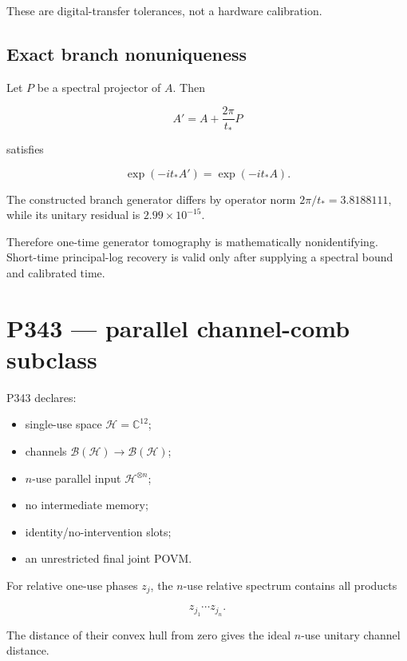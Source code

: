 \documentclass[11pt,a4paper,openany]{report}
\begin{document}
These are digital-transfer tolerances, not a hardware calibration.

\section{Exact branch nonuniqueness}

Let \(P\) be a spectral projector of \(A\). Then

\[
A'=A+\frac{2\pi}{t_*}P
\]

satisfies

\[
\exp(-it_*A')=\exp(-it_*A).
\]

The constructed branch generator differs by operator norm \(2\pi/t_*=3.8188111\), while its unitary residual is \(2.99\times10^{-15}\).

Therefore one-time generator tomography is mathematically nonidentifying. Short-time principal-log recovery is valid only after supplying a spectral bound and calibrated time.

\chapter{P343 --- parallel channel-comb subclass}

P343 declares:

\begin{itemize}
\item 
single-use space \(\mathcal H=\mathbb C^{12}\);

\item 
channels \(\mathcal B(\mathcal H)\to\mathcal B(\mathcal H)\);

\item 
\(n\)-use parallel input \(\mathcal H^{\otimes n}\);

\item 
no intermediate memory;

\item 
identity/\allowbreak{}no-intervention slots;

\item 
an unrestricted final joint POVM.

\end{itemize}

For relative one-use phases \(z_j\), the \(n\)-use relative spectrum contains all products

\[
z_{j_1}\cdots z_{j_n}.
\]

The distance of their convex hull from zero gives the ideal \(n\)-use unitary channel distance.
\end{document}
